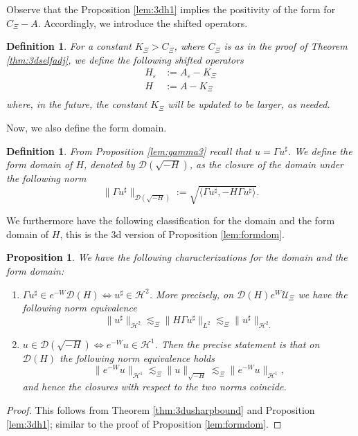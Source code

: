 \documentclass[11pt, oneside]{article}   	%
\newcommand{\assign}{:=}
\newenvironment{enumeratenumeric}{\begin{enumerate}[1.] }{\end{enumerate}}
\newtheorem{definition}[theorem]{Definition}
\newtheorem{proposition}[theorem]{Proposition}
\newcommand{\ED}{\mathscr{D} ( \sqrt{-H})}
\newcommand{\ssp}{\mathscr{H}}
\begin{document}
Observe that the Proposition \ref{lem:3dh1} implies the positivity of the form for $
C_{\Xi} - A.$ Accordingly, we introduce the shifted operators.

\begin{definition} \label{def:setconstant3d}
	For a constant $K_\Xi > C_{\Xi}$, where $C_{\Xi}$ is as in the proof of Theorem \ref{thm:3dselfadj}, we define the following shifted operators
	\begin{align*}
	H_\varepsilon & :=   A_\varepsilon - K_\Xi \\
	H & := A -  K_\Xi  \\
	\end{align*}
	where, in the future, the constant $K_\Xi$ will be updated to be larger, as needed.
\end{definition}

Now, we  also define the form domain.


\begin{definition}\label{def:energySp3d}
	From Proposition \eqref{lem:gamma3} recall that $u= \Gamma u^{\sharp}$. We define the form domain of $H$, denoted by $\ED$, as the closure of the domain under the following norm
	\[ \| \Gamma u^{\sharp} \|_{\ED} \assign
	\sqrt{ \langle \Gamma u^{\sharp}, -{H} \Gamma u^{\sharp} \rangle}
	. \]
\end{definition}



We furthermore have the following classification for the domain and the form
domain of $H$, this is the 3d version of Proposition
\ref{lem:formdom}.
\begin{proposition} \label{lem:3dnormequiv}
	We have the following characterizations for the domain and the form domain:
	\begin{enumeratenumeric}
		\item $\Gamma u^{\sharp} \in e^{- W} \mathscr{D} ({H})
		\Leftrightarrow u^{\sharp} \in \ssp^2$.
		More precisely, on $\mathscr{D} ({H})  e^W \mathscr{U}_{\Xi}$ we have the
		following norm equivalence
		\[ \| u^{\sharp} \|_{\ssp^2} \lesssim_\Xi \| {H} \Gamma u^{\sharp} \|_{L^2}
		\lesssim_\Xi \| u^{\sharp} \|_{\ssp^2 .} \]
		\item $u \in \mathscr{D} ( \sqrt{- {H}} ) \Leftrightarrow
		e^{- W} u \in \ssp^1$.
		Then the precise statement is that on $\mathscr{D} ({H})$ the
		following norm equivalence holds
		\[ \| e^{- W} u \|_{\ssp^1} \lesssim_{\Xi} \| u \|_{\sqrt{- {H}}}
		\lesssim_{\Xi} \| e^{- W} u \|_{\ssp^1}, \]
		and hence the closures with respect to the two norms coincide.
	\end{enumeratenumeric}
\end{proposition}
\begin{proof}
	This follows from Theorem \ref{thm:3dusharpbound} and Proposition \ref{lem:3dh1}; similar to the proof of Proposition \ref{lem:formdom}.
\end{proof}
\end{document}

